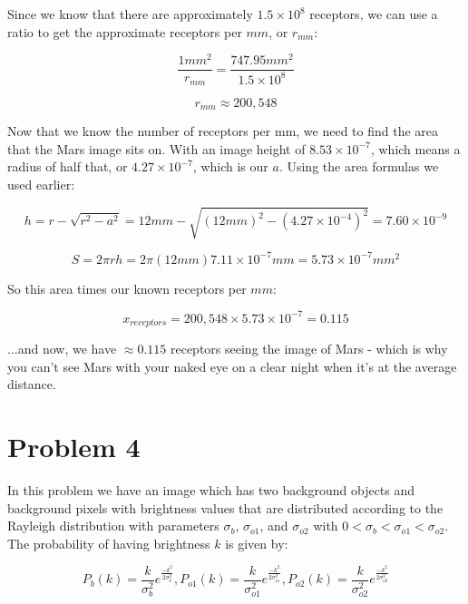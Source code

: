 \documentclass{article}
\begin{document}
\noindent Since we know that there are approximately $1.5\times10^8$ receptors, we can use a ratio to get the approximate receptors per $mm$, or $r_{mm}$:

\begin{equation}
    \frac{1mm^2}{r_{mm}} = \frac{747.95mm^2}{1.5\times 10^8}
\end{equation}

\begin{equation}
    r_{mm} \approx 200,548
\end{equation}

\noindent Now that we know the number of receptors per mm, we need to find the area that the Mars image sits on. With an image height of $8.53\times10^{-7}$, which means a radius of half that, or $4.27\times10^{-7}$, which is our $a$. Using the area formulas we used earlier:

\begin{equation}
    h = r - \sqrt{r^2 - a^2} = 12mm - \sqrt{(12mm)^2 - (4.27\times10^{-4})^2} = 7.60\times10^{-9}
\end{equation}

\begin{equation}
    S = 2 \pi r h = 2 \pi (12mm) {7.11\times10^{-7}mm} = 5.73\times10^{-7} mm^2
\end{equation}

\noindent So this area times our known receptors per $mm$:

\begin{equation}
    x_{receptors} = 200,548 \times 5.73\times10^{-7} = 0.115
\end{equation}

\noindent ...and now, we have $\approx 0.115$ receptors seeing the image of Mars - which is why you can't see Mars with your naked eye on a clear night when it's at the average distance.

\section*{Problem 4}

In this problem we have an image which has two background objects and background pixels with brightness values that are distributed according to the Rayleigh distribution with parameters $\sigma_b$, $\sigma_{o1}$, and $\sigma_{o2}$ with $0<\sigma_b < \sigma_{o1} < \sigma_{o2}$. The probability of having brightness $k$ is given by:

\begin{equation}
    P_b(k) = \frac{k}{\sigma^2_b}e^{\frac{-k^2}{2\sigma^2_b}},
    P_{o1}(k) = \frac{k}{\sigma^2_{o1}}e^{\frac{-k^2}{2\sigma^2_{o1}}},
    P_{o2}(k) = \frac{k}{\sigma^2_{o2}}e^{\frac{-k^2}{2\sigma^2_{o2}}}
\end{equation}
\end{document}

